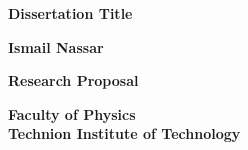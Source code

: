 \thispagestyle{empty}
\begin{center}
\Large

\textbf{Dissertation Title}

\vspace{2.0in}

\textbf{Ismail Nassar}

\vspace{1.5in}

\textbf{Research Proposal}

\vspace{0.5in}

\textbf{Faculty of Physics}\\
\textbf{Technion Institute of Technology}


\end{center}